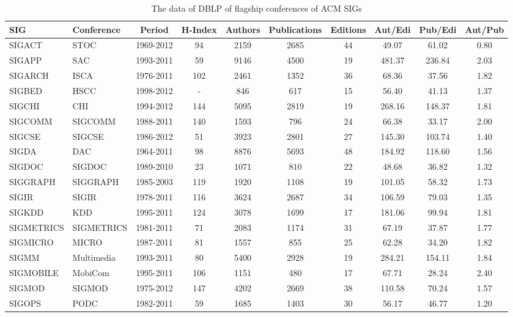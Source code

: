 \begin{table}[!htb]
\centering
\caption{The data of DBLP of flagship conferences of ACM SIGs}
\label{tab:sigs_conference_period}
{\small
\begin{tabular}{|l|l|c|c|c|c|c|c|c|c|} \hline
SIG & Conference & Period & H-Index & Authors & Publications & Editions & Aut/Edi & Pub/Edi & Aut/Pub\\ \hline
SIGACT & STOC & 1969-2012 & 94 & 2159 & 2685 & 44 & 49.07 & 61.02 & 0.80\\ \hline
SIGAPP & SAC & 1993-2011 & 59 & 9146 & 4500 & 19 & 481.37 & 236.84 & 2.03\\ \hline
SIGARCH & ISCA & 1976-2011 & 102 & 2461 & 1352 & 36 & 68.36 & 37.56 & 1.82\\ \hline
SIGBED & HSCC & 1998-2012 & - & 846 & 617 & 15 & 56.40 & 41.13 & 1.37\\ \hline
SIGCHI & CHI & 1994-2012 & 144 & 5095 & 2819 & 19 & 268.16 & 148.37 & 1.81\\ \hline
SIGCOMM & SIGCOMM & 1988-2011 & 140 & 1593 & 796 & 24 & 66.38 & 33.17 & 2.00\\ \hline
SIGCSE & SIGCSE & 1986-2012 & 51 & 3923 & 2801 & 27 & 145.30 & 103.74 & 1.40\\ \hline
SIGDA & DAC & 1964-2011 & 98 & 8876 & 5693 & 48 & 184.92 & 118.60 & 1.56\\ \hline
SIGDOC & SIGDOC & 1989-2010 & 23 & 1071 & 810 & 22 & 48.68 & 36.82 & 1.32\\ \hline
SIGGRAPH & SIGGRAPH & 1985-2003 & 119 & 1920 & 1108 & 19 & 101.05 & 58.32 & 1.73\\ \hline
SIGIR & SIGIR & 1978-2011 & 116 & 3624 & 2687 & 34 & 106.59 & 79.03 & 1.35\\ \hline
SIGKDD & KDD & 1995-2011 & 124 & 3078 & 1699 & 17 & 181.06 & 99.94 & 1.81\\ \hline
SIGMETRICS & SIGMETRICS & 1981-2011 & 71 & 2083 & 1174 & 31 & 67.19 & 37.87 & 1.77\\ \hline
SIGMICRO & MICRO & 1987-2011 & 81 & 1557 & 855 & 25 & 62.28 & 34.20 & 1.82\\ \hline
SIGMM & Multimedia & 1993-2011 & 80 & 5400 & 2928 & 19 & 284.21 & 154.11 & 1.84\\ \hline
SIGMOBILE & MobiCom & 1995-2011 & 106 & 1151 & 480 & 17 & 67.71 & 28.24 & 2.40\\ \hline
SIGMOD & SIGMOD & 1975-2012 & 147 & 4202 & 2669 & 38 & 110.58 & 70.24 & 1.57\\ \hline
SIGOPS & PODC & 1982-2011 & 59 & 1685 & 1403 & 30 & 56.17 & 46.77 & 1.20\\ \hline

\end{tabular}}
\end{table}
